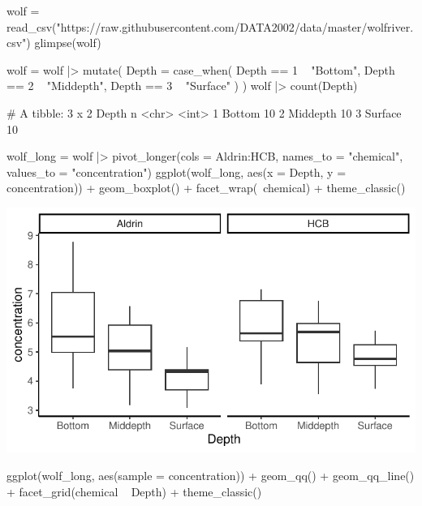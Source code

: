 \documentclass[a4paper]{article}\usepackage[]{graphicx}\usepackage[]{xcolor}
\makeatletter
\def\maxwidth{ %
  \ifdim\Gin@nat@width>\linewidth
    \linewidth
  \else
    \Gin@nat@width
  \fi
}
\makeatother
\begin{document}
\begin{Schunk}
\begin{Sinput}
wolf = read_csv("https://raw.githubusercontent.com/DATA2002/data/master/wolfriver.csv")
glimpse(wolf)
\end{Sinput}
\begin{Sinput}
wolf = wolf |> mutate(
  Depth = case_when(
    Depth == 1 ~ "Bottom",
    Depth == 2 ~ "Middepth",
    Depth == 3 ~ "Surface"
  )
)
wolf |> count(Depth)
\end{Sinput}
\begin{Soutput}
# A tibble: 3 x 2
  Depth        n
  <chr>    <int>
1 Bottom      10
2 Middepth    10
3 Surface     10
\end{Soutput}
\begin{Sinput}
wolf_long = wolf |> 
  pivot_longer(cols = Aldrin:HCB, names_to = "chemical", 
         values_to = "concentration") 
ggplot(wolf_long, aes(x = Depth, y = concentration)) + 
  geom_boxplot() + 
  facet_wrap(~chemical) +
  theme_classic()
\end{Sinput}


{\centering \includegraphics[width=\maxwidth]{figure/listings-unnamed-chunk-257-1} 

}

\begin{Sinput}
ggplot(wolf_long, aes(sample = concentration)) + 
  geom_qq() + geom_qq_line() + 
  facet_grid(chemical ~ Depth) +
  theme_classic()
\end{Sinput}



\end{Schunk}
\end{document}
